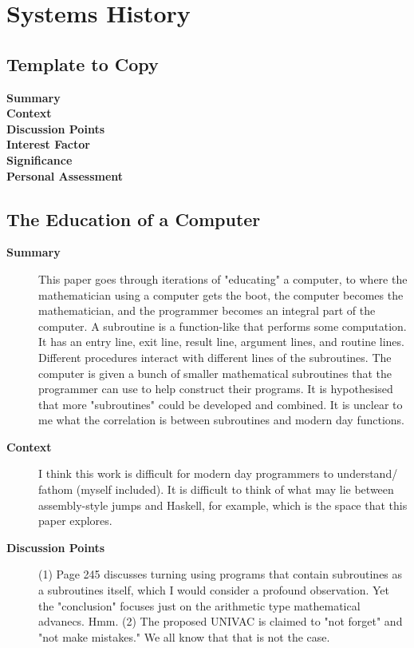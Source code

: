 \chapter {Systems History}

\section {Template to Copy}

\begin{description}
    \item[\textbf{Summary}]
    \item[\textbf{Context}]
    \item[\textbf{Discussion Points}]
    \item[\textbf{Interest Factor}]
    \item[\textbf{Significance}]
    \item[\textbf{Personal Assessment}]
\end{description}

\section {The Education of a Computer \cite{hopper1952education}}

\begin{description}
    \item[\textbf{Summary}] This paper goes through iterations of "educating" a computer, to where the mathematician using a computer gets the boot, the computer becomes the mathematician, and the programmer becomes an integral part of the computer.
        A subroutine is a function-like that performs some computation. It has an entry line, exit line, result line, argument lines, and routine lines.
        Different procedures interact with different lines of the subroutines.
        The computer is given a bunch of smaller mathematical subroutines that the programmer can use to help construct their programs.
        It is hypothesised that more "subroutines" could be developed and combined.
        It is unclear to me what the correlation is between subroutines and modern day functions.
    \item[\textbf{Context}] I think this work is difficult for modern day programmers to understand/ fathom (myself included).
        It is difficult to think of what may lie between assembly-style jumps and Haskell, for example, which is the space that this paper explores.
    \item[\textbf{Discussion Points}] (1) Page 245 discusses turning using programs that contain subroutines as a subroutines itself, which I would consider a profound observation.
        Yet the "conclusion" focuses just on the arithmetic type mathematical advanecs. Hmm.
        (2) The proposed UNIVAC is claimed to "not forget" and "not make mistakes."
        We all know that that is not the case.
\end{description}